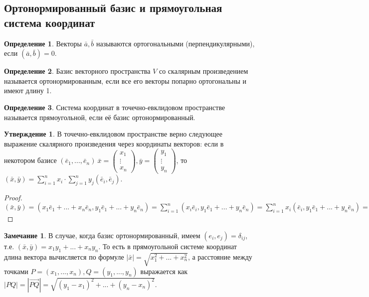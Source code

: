 \documentclass[a4paper, 12pt]{article}
\theoremstyle{definition}
\newtheorem*{definition}{Определение}
\newtheorem*{subtheorem}{Утверждение}
\newtheorem*{remark}{Замечание}
\begin{document}
	\subsection{Ортонормированный базис и прямоугольная система координат}
	\begin{definition}
		Векторы $\bar{a}, \bar{b}$ называются ортогональными (перпендикулярными), если $(\bar{a}, \bar{b}) = 0$.
	\end{definition}
	\begin{definition}
		Базис векторного пространства $V$ со скалярным произведением называется ортонормированным, если все его векторы попарно ортогональны и имеют длину 1.
	\end{definition}
	\begin{definition}
		Система координат в точечно-евклидовом пространстве называется прямоугольной, если её базис ортонормированный.
	\end{definition}
	\begin{subtheorem}
		В точечно-евклидовом пространстве верно следующее выражение скалярного произведения через координаты векторов: если в некотором базисе $ (\bar{e}_{1},...,\bar{e}_{n}) \ \bar{x} = \begin{pmatrix} x_{1} \\ \vdots \\ x_{n} \end{pmatrix}, \bar{y} = \begin{pmatrix} y_{1} \\ \vdots \\ y_{n} \end{pmatrix}$, то $(\bar{x}, \bar{y}) = \sum \limits_{i=1}^n x_{i} \cdot \sum \limits_{j=1}^n y_{j}(\bar{e}_{i}, \bar{e}_{j})$.
	\end{subtheorem}
	\begin{proof}
		$(\bar{x}, \bar{y}) = (x_{1}\bar{e}_{1}+...+x_{n}\bar{e}_{n}, y_{1}\bar{e}_{1}+...+y_{n}\bar{e}_{n}) = \sum \limits_{i=1}^{n}(x_{i}\bar{e}_{i},y_{1}\bar{e}_{1}+...+y_{n}\bar{e}_{n}) = \sum \limits_{i=1}^{n}x_{i}(\bar{e}_{i},y_{1}\bar{e}_{1}+...+y_{n}\bar{e}_{n}) = \sum \limits_{i=1}^n x_{i} \cdot \sum \limits_{j=1}^n y_{j}(\bar{e}_{i}, \bar{e}_{j})$
	\end{proof}
	\begin{remark}
		В случае, когда базис ортонормированный, имеем $(e_{i}, e_{j}) = \delta_{ij}$, т.е. $(\bar{x}, \bar{y}) = x_{1}y_{1}+...+x_{n}y_{n}$. То есть в прямоугольной системе координат длина вектора вычисляется по формуле $|\bar{x}| = \sqrt{x_{1}^2+...+x_{n}^2}$, а расстояние между точками $P = (x_{1},...,x_{n}), Q = (y_{1},...,y_{n})$ выражается как $|PQ| = |\overrightarrow{PQ}| = \sqrt{(y_{1} - x_{1})^2+...+(y_{n}- x_{n})^2}$.
	\end{remark}
\end{document}

